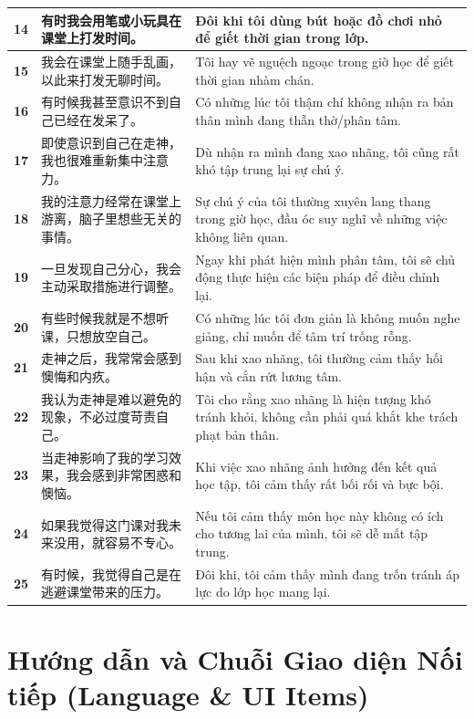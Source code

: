 \documentclass[11pt,a4paper]{article}
\begin{document}
\begin{longtable}{>{\bfseries}c p{6.5cm} p{8cm}}
\midrule
14 & 有时我会用笔或小玩具在课堂上打发时间。 & Đôi khi tôi dùng bút hoặc đồ chơi nhỏ để giết thời gian trong lớp. \\
\midrule
15 & 我会在课堂上随手乱画，以此来打发无聊时间。 & Tôi hay vẽ nguệch ngoạc trong giờ học để giết thời gian nhàm chán. \\
\midrule
16 & 有时候我甚至意识不到自己已经在发呆了。 & Có những lúc tôi thậm chí không nhận ra bản thân mình đang thẫn thờ/phân tâm. \\
\midrule
17 & 即使意识到自己在走神，我也很难重新集中注意力。 & Dù nhận ra mình đang xao nhãng, tôi cũng rất khó tập trung lại sự chú ý. \\
\midrule
18 & 我的注意力经常在课堂上游离，脑子里想些无关的事情。 & Sự chú ý của tôi thường xuyên lang thang trong giờ học, đầu óc suy nghĩ về những việc không liên quan. \\
\midrule
19 & 一旦发现自己分心，我会主动采取措施进行调整。 & Ngay khi phát hiện mình phân tâm, tôi sẽ chủ động thực hiện các biện pháp để điều chỉnh lại. \\
\midrule
20 & 有些时候我就是不想听课，只想放空自己。 & Có những lúc tôi đơn giản là không muốn nghe giảng, chỉ muốn để tâm trí trống rỗng. \\
\midrule
21 & 走神之后，我常常会感到懊悔和内疚。 & Sau khi xao nhãng, tôi thường cảm thấy hối hận và cắn rứt lương tâm. \\
\midrule
22 & 我认为走神是难以避免的现象，不必过度苛责自己。 & Tôi cho rằng xao nhãng là hiện tượng khó tránh khỏi, không cần phải quá khắt khe trách phạt bản thân. \\
\midrule
23 & 当走神影响了我的学习效果，我会感到非常困惑和懊恼。 & Khi việc xao nhãng ảnh hưởng đến kết quả học tập, tôi cảm thấy rất bối rối và bực bội. \\
\midrule
24 & 如果我觉得这门课对我未来没用，就容易不专心。 & Nếu tôi cảm thấy môn học này không có ích cho tương lai của mình, tôi sẽ dễ mất tập trung. \\
\midrule
25 & 有时候，我觉得自己是在逃避课堂带来的压力。 & Đôi khi, tôi cảm thấy mình đang trốn tránh áp lực do lớp học mang lại. \\
\bottomrule
\end{longtable}

\newpage
\section{Hướng dẫn và Chuỗi Giao diện Nối tiếp (Language \& UI Items)}
\end{document}

